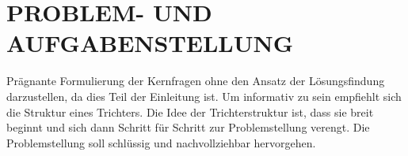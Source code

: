 \documentclass[./\jobname.tex]{subfiles}
\begin{document}
%
\section{PROBLEM- UND AUFGABENSTELLUNG}\label{sec: Zielsetzung}\raggedbottom
%
Prägnante Formulierung der Kernfragen ohne den Ansatz der Lösungsfindung darzustellen, da dies Teil der Einleitung ist. Um informativ zu sein empfiehlt sich die Struktur eines Trichters. Die Idee der Trichterstruktur ist, dass sie breit beginnt und sich dann Schritt für Schritt zur Problemstellung verengt. Die Problemstellung soll schlüssig und nachvollziehbar hervorgehen.
%
\end{document}
